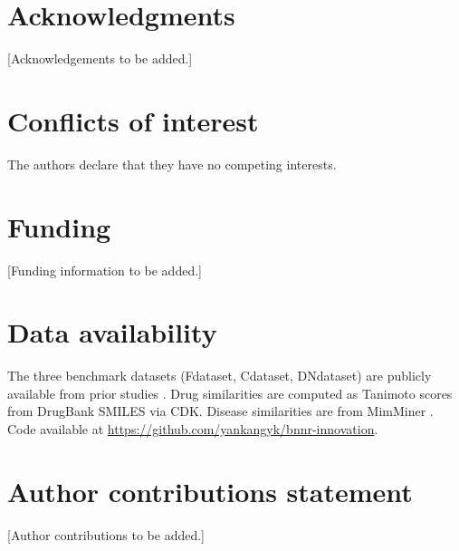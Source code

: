 \documentclass[unnumsec,webpdf,contemporary,large]{oup-authoring-template}
\begin{document}
\section{Acknowledgments}

[Acknowledgements to be added.]

\section{Conflicts of interest}

The authors declare that they have no competing interests.

\section{Funding}

[Funding information to be added.]

\section{Data availability}

The three benchmark datasets (Fdataset, Cdataset, DNdataset) are publicly available from prior studies \citep{gottlieb2011,yang2019}. Drug similarities are computed as Tanimoto scores from DrugBank SMILES via CDK. Disease similarities are from MimMiner \citep{vandriel2006}. Code available at \url{https://github.com/yankangyk/bnnr-innovation}.

\section{Author contributions statement}

[Author contributions to be added.]




\clearpage
\raggedend
\end{document}
